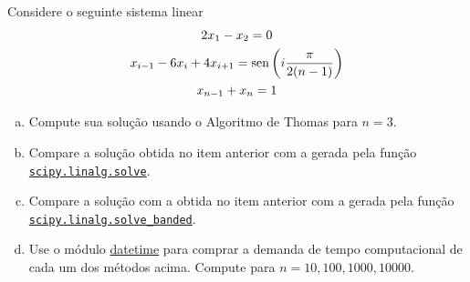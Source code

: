 \begin{exer}\label{exer:sislin_tridiag}
  Considere o seguinte sistema linear
  \begin{gather}
    2x_1 - x_2 = 0\\
    x_{i-1} - 6x_i + 4x_{i+1} = \operatorname{sen}\left(i\frac{\pi}{2(n-1)}\right)\\
    x_{n-1} + x_n = 1
  \end{gather}
  \begin{enumerate}[a)]
  \item Compute sua solução usando o Algoritmo de Thomas para $n=3$.
  \item Compare a solução obtida no item anterior com a gerada pela função \href{https://docs.scipy.org/doc/scipy/reference/generated/scipy.linalg.solve.html}{\lstinline+scipy.linalg.solve+}.
  \item Compare a solução com a obtida no item anterior com a gerada pela função \href{https://docs.scipy.org/doc/scipy/reference/generated/scipy.linalg.solve_banded.html}{\lstinline+scipy.linalg.solve_banded+}.
  \item Use o módulo {\python} \href{https://docs.python.org/3/library/datetime.html?highlight=datetime#module-datetime}{datetime} para comprar a demanda de tempo computacional de cada um dos métodos acima. Compute para $n=10,100,1000,10000$.
  \end{enumerate}
\end{exer}

